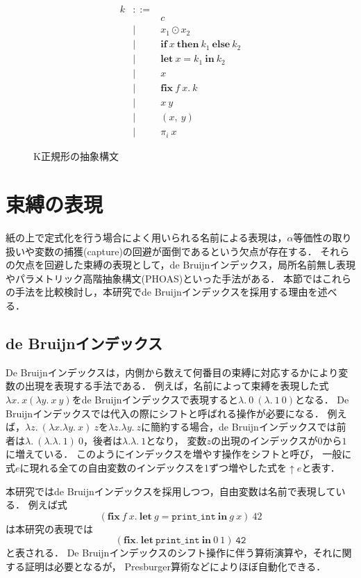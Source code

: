 \documentclass{compsoft}
\newcommand{\keyword}[1]{\mathbf{#1}}
\newcommand{\IF}{\keyword{if}}
\newcommand{\THEN}{\keyword{then}}
\newcommand{\ELSE}{\keyword{else}}
\newcommand{\LET}{\keyword{let}}
\newcommand{\FIX}{\keyword{fix}}
\newcommand{\IN}{\keyword{in}}
\begin{document}
\begin{figure}[tp]
	\[ \begin{array}{lcl}
			k & ::= & \\
				& & c \\
				& | & x_1 \odot x_2 \\
				& | & \IF~x~\THEN~k_1~\ELSE~k_2 \\
				& | & \LET~x=k_1~\IN~k_2 \\
				& | & x \\
				& | & \FIX~f~x.~k \\
				& | & x~y \\
				& | & (x,~y) \\
				& | & \pi_i~x 
	\end{array} \]
	\caption{K正規形の抽象構文}
	\label{eqn:mincaml-knormal}
\end{figure}

\section{束縛の表現}\label{section:bindings}
紙の上で定式化を行う場合によく用いられる名前による表現は，$\alpha$等価性の取り扱いや変数の捕獲(capture)の回避が面倒であるという欠点が存在する．
それらの欠点を回避した束縛の表現として，de Bruijnインデックス\cite{Pierce:TypeSystems}，局所名前無し表現\cite{chargueraud-11-ln}やパラメトリック高階抽象構文(PHOAS)\cite{Chlipala:2008:PHA:1411204.1411226}といった手法がある．
本節ではこれらの手法を比較検討し，本研究でde Bruijnインデックスを採用する理由を述べる．

\subsection{de Bruijnインデックス}
De Bruijnインデックスは，内側から数えて何番目の束縛に対応するかにより変数の出現を表現する手法である．
例えば，名前によって束縛を表現した式$\lambda x.~x (\lambda y.~x~y)$をde Bruijnインデックスで表現すると$\lambda.~0~(\lambda.~1~0)$となる．
De Bruijnインデックスでは代入の際にシフトと呼ばれる操作が必要になる．
例えば，$\lambda z.~(\lambda x.\lambda y.~x)~z$を$\lambda z.\lambda y.~z$に簡約する場合，de Bruijnインデックスでは前者は$\lambda.~(\lambda.\lambda.~1)~0$，後者は$\lambda.\lambda.~1$となり，
変数$z$の出現のインデックスが$0$から$1$に増えている．
このようにインデックスを増やす操作をシフトと呼び，
一般に式$e$に現れる全ての自由変数のインデックスを1ずつ増やした式を$\uparrow e$と表す．

本研究ではde Bruijnインデックスを採用しつつ，自由変数は名前で表現している．
例えば式
\[(\FIX~f~x.~\LET~g=\texttt{print\_int}~\IN~g~x)~42\]
は本研究の表現では
\[(\FIX.~\LET~\texttt{print\_int}~\IN~0~1)~\texttt{42}\]と表される．
De Bruijnインデックスのシフト操作に伴う算術演算や，それに関する証明は必要となるが，
Presburger算術などによりほぼ自動化できる．
\end{document}
